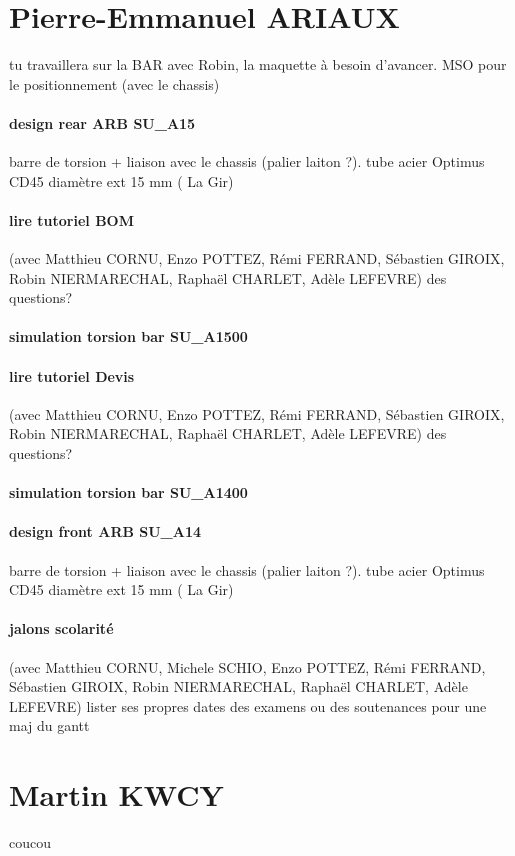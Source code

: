  
 \newpage \section*{Pierre-Emmanuel ARIAUX} 
 \par tu travaillera sur la BAR avec Robin, la maquette à besoin d'avancer. MSO pour le positionnement (avec le chassis)
\paragraph{design rear ARB SU\_A15} barre de torsion + liaison avec le chassis (palier laiton ?). tube acier Optimus CD45 diamètre ext 15 mm ( La Gir)
\paragraph{lire tutoriel BOM} (avec Matthieu CORNU, Enzo POTTEZ, Rémi FERRAND, Sébastien GIROIX, Robin NIERMARECHAL, Raphaël CHARLET, Adèle LEFEVRE) des questions?
\paragraph{simulation torsion bar SU\_A1500} 
\paragraph{lire tutoriel Devis} (avec Matthieu CORNU, Enzo POTTEZ, Rémi FERRAND, Sébastien GIROIX, Robin NIERMARECHAL, Raphaël CHARLET, Adèle LEFEVRE) des questions?
\paragraph{simulation torsion bar SU\_A1400} 
\paragraph{design front ARB SU\_A14} barre de torsion + liaison avec le chassis (palier laiton ?). tube acier Optimus CD45 diamètre ext 15 mm ( La Gir)
\paragraph{jalons scolarité} (avec Matthieu CORNU, Michele SCHIO, Enzo POTTEZ, Rémi FERRAND, Sébastien GIROIX, Robin NIERMARECHAL, Raphaël CHARLET, Adèle LEFEVRE) lister ses propres dates des examens ou des soutenances pour une maj du gantt

 
 \newpage \section*{Martin KWCY} 
 \par coucou
